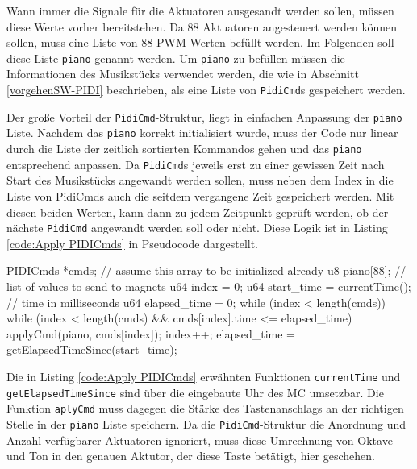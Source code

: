 Wann immer die Signale für die Aktuatoren ausgesandt werden sollen, müssen diese Werte vorher bereitstehen.
Da 88 Aktuatoren angesteuert werden können sollen, muss eine Liste von 88 \ac{PWM}-Werten befüllt werden.
Im Folgenden soll diese Liste \lstinline{piano} genannt werden.
Um \lstinline{piano} zu befüllen müssen die Informationen des Musikstücks verwendet werden, die wie in Abschnitt \ref{vorgehenSW-PIDI} beschrieben, als eine Liste von \lstinline{PidiCmd}s gespeichert werden.

Der große Vorteil der \lstinline|PidiCmd|-Struktur, liegt in einfachen Anpassung der \lstinline|piano| Liste.
Nachdem das \lstinline|piano| korrekt initialisiert wurde, muss der Code nur linear durch die Liste der zeitlich sortierten Kommandos gehen und das \lstinline|piano| entsprechend anpassen.
Da \lstinline|PidiCmd|s jeweils erst zu einer gewissen Zeit nach Start des Musikstücks angewandt werden sollen, muss neben dem Index in die Liste von \ac{PidiCmd}s auch die seitdem vergangene Zeit gespeichert werden.
Mit diesen beiden Werten, kann dann zu jedem Zeitpunkt geprüft werden, ob der nächste \lstinline{PidiCmd} angewandt werden soll oder nicht.
Diese Logik ist in Listing \ref{code:Apply PIDICmds} in Pseudocode dargestellt.

\begin{UnbrokenCodePage}[style=CStyle, caption={Nutzung der \lstinline|PidiCmd|-Struktur}, label={code:Apply PIDICmds}]
PIDICmds *cmds; // assume this array to be initialized already
u8  piano[88];  // list of values to send to magnets
u64 index        = 0;
u64 start_time   = currentTime(); // time in milliseconds
u64 elapsed_time = 0;
while (index < length(cmds)) {
    while (index < length(cmds) && cmds[index].time <= elapsed_time) {
        applyCmd(piano, cmds[index]);
        index++;
    }
    elapsed_time = getElapsedTimeSince(start_time);
}
\end{UnbrokenCodePage}

Die in Listing \ref{code:Apply PIDICmds} erwähnten Funktionen \lstinline|currentTime| und \lstinline|getElapsedTimeSince| sind über die eingebaute Uhr des \ac{MC} umsetzbar.
Die Funktion \lstinline|aplyCmd| muss dagegen die Stärke des Tastenanschlags an der richtigen Stelle in der \lstinline|piano| Liste speichern.
Da die \lstinline|PidiCmd|-Struktur die Anordnung und Anzahl verfügbarer Aktuatoren ignoriert, muss diese Umrechnung von Oktave und Ton in den genauen Aktutor, der diese Taste betätigt, hier geschehen.


